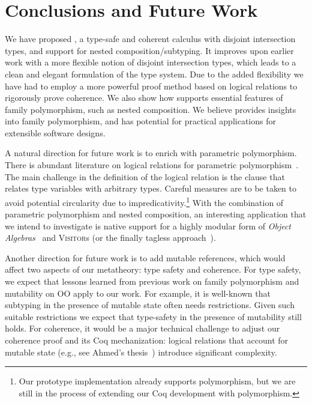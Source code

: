 
\section{Conclusions and Future Work}
\label{sec:conclusion}

We have proposed \name, a type-safe and coherent calculus with disjoint
intersection types, and support for nested composition/subtyping. It
improves upon earlier work with a more
flexible notion of disjoint intersection types, which leads to
a clean and elegant formulation of the type system. Due to the added
flexibility we have had to employ a more powerful proof method based on logical
relations to rigorously prove coherence.
We also show how \name supports essential features of family
polymorphism, such as nested composition. We believe \name provides insights into family polymorphism, and
has potential for practical applications for extensible software designs.

A natural direction for future work is to enrich \name with parametric
polymorphism. There is abundant literature on logical relations for parametric
polymorphism~\citep{reynolds1983types}. %
The main challenge in the definition of the
logical relation is the clause that relates type variables with arbitrary types. Careful
measures are to be taken to avoid potential circularity due to
impredicativity.\footnote{ Our prototype implementation already
  supports polymorphism, but we are still in the process of extending our Coq
  development with polymorphism.} With the combination of parametric polymorphism and nested
composition, an interesting application that we intend to investigate is native
support for a highly modular form of \textit{Object Algebras}~\citep{oliveira2012extensibility, xuan_traits} and \textsc{Visitor}s
(or the finally tagless approach~\citep{CARETTE_2009}).

Another direction for future work is to add mutable references, which would
affect two aspects of our metatheory: type safety and coherence. For type safety,
we expect that lessons learned from previous work on family polymorphism and
mutability on OO apply to our work. For example, it is well-known that
subtyping in the presence of mutable state often needs restrictions. Given such
suitable restrictions we expect that type-safety in the presence of mutability
still holds. For coherence, it would be a major technical challenge to adjust
our coherence proof and its Coq mechanization: logical relations that account
for mutable state (e.g., see Ahmed's thesis~\citep{ahmed2004semantics}) introduce significant complexity.





